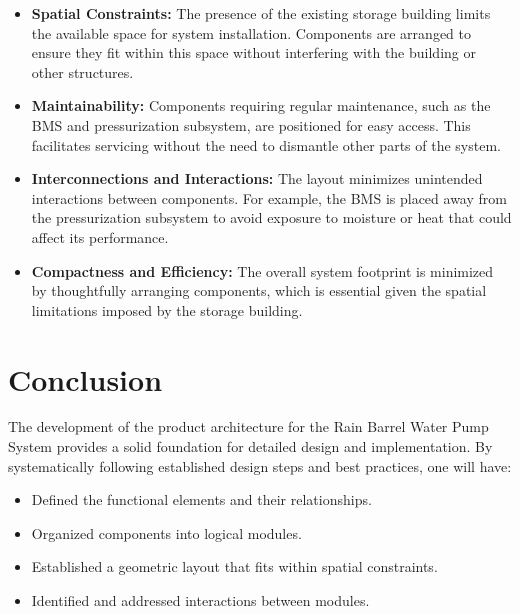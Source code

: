 \documentclass[12pt]{article}
\begin{document}
\begin{itemize}
    \item \textbf{Spatial Constraints:} The presence of the existing storage building limits the available space for system installation. Components are arranged to ensure they fit within this space without interfering with the building or other structures.

    \item \textbf{Maintainability:} Components requiring regular maintenance, such as the BMS and pressurization subsystem, are positioned for easy access. This facilitates servicing without the need to dismantle other parts of the system.

    \item \textbf{Interconnections and Interactions:} The layout minimizes unintended interactions between components. For example, the BMS is placed away from the pressurization subsystem to avoid exposure to moisture or heat that could affect its performance.

    \item \textbf{Compactness and Efficiency:} The overall system footprint is minimized by thoughtfully arranging components, which is essential given the spatial limitations imposed by the storage building.

\end{itemize}


\section{Conclusion}
\label{sec:conclusion}

The development of the product architecture for the Rain Barrel Water Pump System provides a solid foundation for detailed design and implementation. By systematically following established design steps and best practices, one will have:

\begin{itemize}
    \item Defined the functional elements and their relationships.
    \item Organized components into logical modules.
    \item Established a geometric layout that fits within spatial constraints.
    \item Identified and addressed interactions between modules.
\end{itemize}
\end{document}
